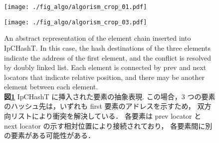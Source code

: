 \begin{figure}
  \texttt{[image: ./fig\_algo/algorism\_crop\_01.pdf]}
  \caption{
    Symbols used in Fig. \ref{fig_IpCHashT_apparence}〜\ref{fig_IpCHashT_deletion_case06}.
    `` Ope. '' indecates the execution order, and `` Ope. 0 '' means the initial state.
    The down arrow is placed on the array element indicated by the hash destination.
    Each element is composed by a circle, a prev locator, and a next locator.
    However, locators are omitted when there are no connection.
    Circles written with dotted lines represent empty elements.
    Green boxes and arrows represent movement of elements.
    Crosses indicate that the linke is deleted.
    The color scheme is blue for the initial state, red for element insertion and deletion, and green for element movement.
    \\
    {\bf 図\ref{fig_IpCHashT_fig_description}}
    Fig. \ref{fig_IpCHashT_apparence}〜\ref{fig_IpCHashT_deletion_case06}に用いる記号．
    ``Ope.''は，実行順序を表し，``Ope. 0'' の場合は初期状態を意味する．
    下向き矢印は，ハッシュ先が示す配列要素の上に置かれる．
    各要素は，丸 1 つと prev locator 1 つ，next locator 1 つで構成される．
    ただし，接続が無い場合 locator は省略される．
    点線で書かれた丸は空の要素を表す．また，緑色の枠線と矢印は要素の移動を表す．
    バツ印はリストの削除表す．
    配色は，青色を初期状態，赤色を要素の挿入と削除，緑色を要素の移動，としている．
  }
  \label{fig_IpCHashT_fig_description}
  \texttt{[image: ./fig\_algo/algorism\_crop\_03.pdf]}
  \caption{
    An abstract representation of the element chain inserted into IpCHashT.
    In this case, the hash destinations of the three elements indicate the address of the first element,
    and the conflict is resolved by doubly linked list.
    Each element is connected by prev and next locators that indicate relative position, 
    and there may be another element between each element.
    \\
    {\bf 図\ref{fig_IpCHashT_apparence}}
    IpCHashT に挿入された要素の抽象表現.
    この場合，3 つの要素のハッシュ先は，いずれも first 要素のアドレスを示すため，
    双方向リストにより衝突を解決している．
    各要素は prev locator と next locator の示す相対位置により接続されており，
    各要素間に別の要素がある可能性がある．
  }
  \label{fig_IpCHashT_apparence}

\end{figure}
